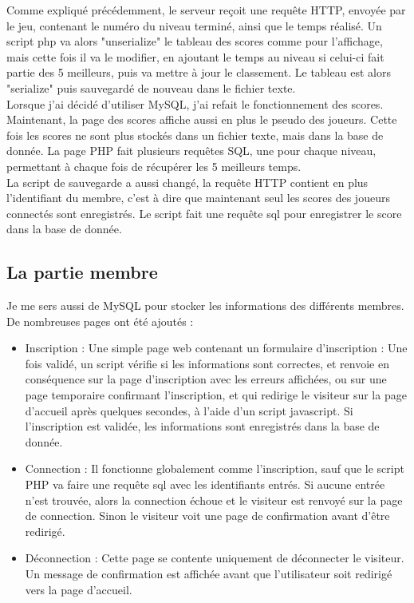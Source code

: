 \documentclass[12pt]{article}
\begin{document}
Comme expliqué précédemment, le serveur reçoit une requête HTTP, envoyée par le jeu, contenant le numéro du niveau terminé, ainsi que le temps réalisé. Un script php va alors "unserialize" le tableau des scores comme pour l'affichage, mais cette fois il va le modifier, en ajoutant le temps au niveau si celui-ci fait partie des 5 meilleurs, puis va mettre à jour le classement. Le tableau est alors "serialize" puis sauvegardé de nouveau dans le fichier texte.\\

Lorsque j'ai décidé d'utiliser MySQL, j'ai refait le fonctionnement des scores. Maintenant, la page des scores affiche aussi en plus le pseudo des joueurs. Cette fois les scores ne sont plus stockés dans un fichier texte, mais dans la base de donnée. La page PHP fait plusieurs requêtes SQL, une pour chaque niveau, permettant à chaque fois de récupérer les 5 meilleurs temps.\\
La script de sauvegarde a aussi changé, la requête HTTP contient en plus l'identifiant du membre, c'est à dire que maintenant seul les scores des joueurs connectés sont enregistrés. Le script fait une requête sql pour enregistrer le score dans la base de donnée.

\subsection{La partie membre}

Je me sers aussi de MySQL pour stocker les informations des différents membres. De nombreuses pages ont été ajoutés :
\begin{itemize}
\item Inscription : Une simple page web contenant un formulaire d'inscription : Une fois validé, un script vérifie si les informations sont correctes, et renvoie en conséquence sur la page d'inscription avec les erreurs affichées, ou sur une page temporaire confirmant l'inscription, et qui redirige le visiteur sur la page d'accueil après quelques secondes, à l'aide d'un script javascript. Si l'inscription est validée, les informations sont enregistrés dans la base de donnée.
\item Connection : Il fonctionne globalement comme l'inscription, sauf que le script PHP va faire une requête sql avec les identifiants entrés. Si aucune entrée n'est trouvée, alors la connection échoue et le visiteur est renvoyé sur la page de connection. Sinon le visiteur voit une page de confirmation avant d'être redirigé.
\item Déconnection : Cette page se contente uniquement de déconnecter le visiteur. Un message de confirmation est affichée avant que l'utilisateur soit redirigé vers la page d'accueil.
\end{itemize}
\end{document}
